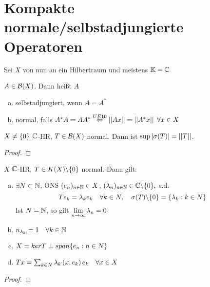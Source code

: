 	\section{Kompakte normale/selbstadjungierte Operatoren}
	Sei $X$ von nun an ein Hilbertraum und meistens $\K = \C$

	\begin{definition}
	\label{def:5.20}
		$A \in \BS[X]$. Dann heißt $A$ 
			\begin{enumerate}[a)]
				\item selbstadjungiert, wenn $A = A^*$
				\item normal, falls $A^* A = A A^* \aq[UE10] \norm{Ax} = \norm{A^* x} \; \forall x \in X$ 
			\end{enumerate}
	\end{definition}
	
	\begin{lemma}
	\label{lem:5.21}
		$X \neq \set{0}$ $\C$-HR, $T\in \BS[X]$ normal. Dann ist $\sup|\sigma(T)| = \norm{T}$.
	\end{lemma}

	\begin{proof}
		\todor	
	\end{proof}

		
	\begin{thm}
	\label{thm:5.22}
		$X$ $\C$-HR, $T\in K(X)\backslash\set{0}$ normal. Dann gilt:
			\begin{enumerate}[a)]
				\item $\exists N\subset \N$, ONS $\ff{e}{n}{\N} \in X$, 
					$\ff{\lambda}{n}{\N}\in \C\backslash\set{0},$ s.d. 
					$$ T e_k = \lambda_k e_k \quad \forall k\in N, \quad 
						\sigma(T)\backslash\set{0} = \set{\lambda_k: k \in N} $$
				Ist $N = \N$, so gilt $\disp \limes \lambda_n = 0$
				\item $n_{\lambda_k} = 1 \quad \forall k\in\N$
				\item $X = ker T \perp span\set{e_n : n\in N}$
				\item $Tx = \sum_{k\in N} \lambda_k \Sp{x,e_k} e_k \quad \forall x \in X$
			\end{enumerate}
	\end{thm}
	
	\begin{proof}
		\todor	
	\end{proof}

